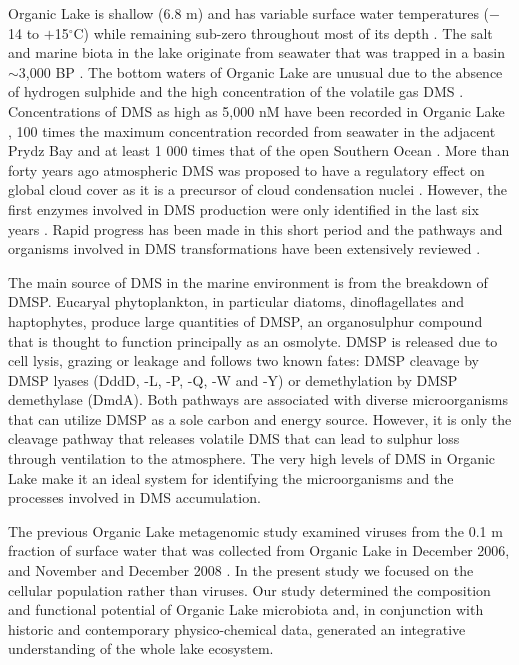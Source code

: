 Organic Lake is shallow (6.8 m) and has variable surface water temperatures ($-$14 to $+$15$^{\circ}$C) while remaining sub-zero throughout most of its depth \cite{Franzmann1987b, Gibson1991, Roberts1993b, Gibson1999}.
The salt and marine biota in the lake originate from seawater that was trapped in a basin $\sim$3,000 BP \cite{Zwartz1998, Bird1991}. 
The bottom waters of Organic Lake are unusual due to the absence of hydrogen sulphide and the high concentration of the volatile gas \ac{DMS} \cite{Deprez1986, Franzmann1987b, Gibson1991, Roberts1993a, Roberts1993b}. 
Concentrations of \ac{DMS} as high as 5,000 nM have been recorded in Organic Lake \cite{Gibson1991}, 100 times the maximum concentration recorded from seawater in the adjacent Prydz Bay and at least 1 000 times that of the open Southern Ocean \cite{Curran1998}.
More than forty years ago atmospheric \ac{DMS} was proposed to have a regulatory effect on global cloud cover as it is a precursor of cloud condensation nuclei \cite{Lovelock1972, Charlson1987}.
However, the first enzymes involved in \ac{DMS} production were only identified in the last six years \cite{Todd2007}.
Rapid progress has been made in this short period and the pathways and organisms involved in \ac{DMS} transformations have been extensively reviewed \cite{Johnston2008, Schafer2010, Curson2011b, Reisch2011b, Moran2012}. 

The main source of \ac{DMS} in the marine environment is from the breakdown of \ac{DMSP}. 
Eucaryal phytoplankton, in particular diatoms, dinoflagellates and haptophytes, produce large quantities of \ac{DMSP}, an organosulphur compound that is thought to function principally as an osmolyte. 
\ac{DMSP} is released due to cell lysis, grazing or leakage and follows two known fates: \ac{DMSP} cleavage by \ac{DMSP} lyases (DddD, -L, -P, -Q, -W and -Y) or demethylation by \ac{DMSP} demethylase (DmdA).
 Both pathways are associated with diverse microorganisms that can utilize \ac{DMSP} as a sole carbon and energy source. 
However, it is only the cleavage pathway that releases volatile \ac{DMS} that can lead to sulphur loss through ventilation to the atmosphere.
The very high levels of \ac{DMS} in Organic Lake make it an ideal system for identifying the microorganisms and the processes involved in \ac{DMS} accumulation. 

The previous Organic Lake metagenomic study examined viruses from the 0.1 \textmu{}m fraction of surface water that was collected from Organic Lake in December 2006, and November and December 2008 \cite{Yau2011}. 
In the present study we focused on the cellular population rather than viruses. 
Our study determined the composition and functional potential of Organic Lake microbiota and, in conjunction with historic and contemporary physico-chemical data, generated an integrative understanding of the whole lake ecosystem. 


